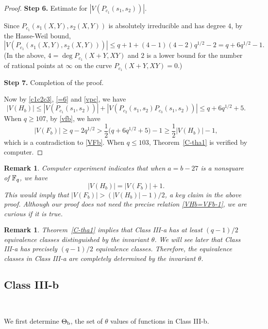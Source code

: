 \documentclass{amsart}
\newtheorem{rmk}[thm]{Remark}
\numberwithin{equation}{section}
\theoremstyle{definition}
\newcommand{\f}{\Bbb F}
\begin{document}
\begin{proof}
\medskip

{\bf Step 6.} Estimate for $|V(P_{c_1}(s_1,s_2))|$.\

Since $P_{c_1}(s_1(X,Y),s_2(X,Y))$ is absolutely irreducible and has degree $4$, by the Hasse-Weil bound, 
\begin{equation}\label{vpc}
|V(P_{c_1}(s_1(X,Y),s_2(X,Y)))|\le q+1+(4-1)(4-2)q^{1/2}-2=q+6q^{1/2}-1.
\end{equation}
(In the above, $4=\deg P_{c_1}(X+Y,XY)$ and $2$ is a lower bound for the number of rational points at $\infty$ on the curve $P_{c_1}(X+Y,XY)=0$.)

\medskip

{\bf Step 7.} Completion of the proof.\

Now by \eqref{c1c2c3}, \eqref{=6} and \eqref{vpc}, we have
\[
|V(H_b)|\le |V(P_{c_1}(s_1,s_2))|+|V(P_{c_2}(s_1,s_2)P_{c_3}(s_1,s_2))|\le q+6q^{1/2}+5.
\]
When $q\ge 107$, by \eqref{vfb}, we have
\[
|V(F_b)|\ge q-2q^{1/2}>\frac 12\bigl(q+6q^{1/2}+5\bigr)-1\ge\frac 12|V(H_b)|-1,
\]
which is a contradiction to \eqref{VFb}. When $q\le 103$, Theorem~\ref{C-tha1} is verified by computer.
\end{proof}

\begin{rmk}\rm
Computer experiment indicates that when $a=b-27$ is a nonsquare of $\f_q$, we have
\begin{equation}\label{VHb=VFb-1}
|V(H_b)|=|V(F_b)|+1.
\end{equation}
This would imply that $|V(F_b)|>(|V(H_b)|-1)/2$, a key claim in the above proof. 
Although our proof does not need the precise relation \eqref{VHb=VFb-1}, we are curious if it is true.
\end{rmk}

\begin{rmk}\rm
Theorem~\ref{C-tha1} implies that Class III-a has at least $(q-1)/2$ equivalence classes distinguished by the invariant $\theta$. We will see later that Class III-a has precisely $(q-1)/2$ equivalence classes. Therefore, the equivalence classes in Class III-a are completely determined by the invariant $\theta$.
\end{rmk}

\subsection{Class III-b}\

We first determine $\Theta_{\rm b}$, the set of $\theta$ values of functions in Class III-b. 
\end{document}
